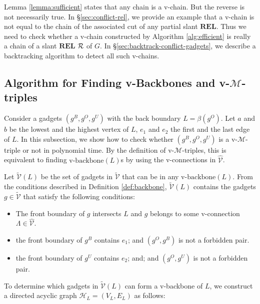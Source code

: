 \documentclass[11pt]{article}
\newcommand{\R}{{\cal R}}
\newcommand{\HH}{\mathcal{H}}
\newcommand{\MM}{\mathcal{M}}
\newcommand{\VV}{\mathcal{V}}
\newcommand{\REL}{\mathbf{REL}}
\begin{document}
Lemma \ref{lemma:sufficient} states that any chain is a v-chain.
But the reverse is not necessarily true.
In \S \ref{sec:conflict-rel}, we provide
an example that a v-chain
is not equal to the chain of
the associated cut of any partial slant $\REL$.
Thus we need to check whether a v-chain constructed by
Algorithm \ref{alg:efficient} is really
a chain of a slant $\REL$ $\R$ of $G$.
In \S \ref{sec:backtrack-conflict-gadgets},
we describe a backtracking algorithm to detect all such v-chains.

\subsection{Algorithm for Finding v-Backbones and v-$\MM$-triples}
\label{sec:triple}

Consider a gadgets $(g^B, g^O, g^U)$ with the back boundary $L=\beta(g^O)$.
Let $a$ and $b$ be the lowest and the highest vertex of $L$,
$e_1$ and $e_2$ the first
and the last edge of $L$. In this subsection,
we show how to check whether $(g^B, g^O, g^U)$ is a v-$\MM$-triple or not
in polynomial time.
By the definition of v-$\MM$-triples,
this is equivalent to finding
$\mbox{v-backbone}(L)$s by using the v-connections in $\hat{\VV}$.

Let $\tilde{\VV}(L)$ be the set of gadgets in $\tilde{\VV}$ that can be in
any $\mbox{v-backbone}(L)$. From the conditions described in
Definition \ref{def:backbone}, $\tilde{\VV}(L)$ contains the gadgets
$g \in \tilde{\VV}$ that satisfy the following conditions:

\begin{itemize}
\item The front boundary of $g$ intersects $L$ and $g$ belongs to
some v-connection $\Lambda \in \hat{\VV}$.

\item the front boundary of $g^B$ contains $e_1$;
and $(g^O,g^B)$ is not a forbidden pair.

\item the front boundary of $g^U$ contains $e_2$;
and;
and $(g^O,g^U)$ is not a forbidden pair.
\end{itemize}







To determine which gadgets in $\tilde{\VV}(L)$ can form
a v-backbone of $L$, we construct a directed acyclic graph
$\HH_L=(V_L,E_L)$  as follows:
\end{document}

